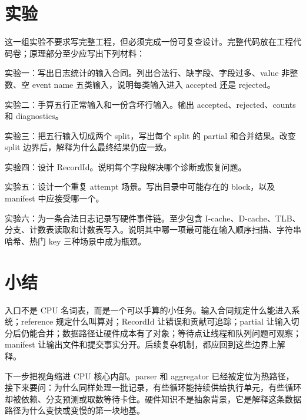 \section{实验}

这一组实验不要求写完整工程，但必须完成一份可复查设计。完整代码放在工程代码卷；原理部分至少应写出下列材料：

\begin{exercisebox}
实验一：写出日志统计的输入合同。列出合法行、缺字段、字段过多、value 非整数、空 event name 五类输入，说明每类输入进入 accepted 还是 rejected。

实验二：手算五行正常输入和一份含坏行输入。输出 accepted、rejected、counts 和 diagnostics。

实验三：把五行输入切成两个 split，写出每个 split 的 partial 和合并结果。改变 split 边界后，解释为什么最终结果仍应一致。

实验四：设计 RecordId。说明每个字段解决哪个诊断或恢复问题。

实验五：设计一个重复 attempt 场景。写出目录中可能存在的 block，以及 manifest 中应接受哪一个。

实验六：为一条合法日志记录写硬件事件链。至少包含 I-cache、D-cache、TLB、分支、计数表读取和计数表写入。说明其中哪一项最可能在输入顺序扫描、字符串哈希、热门 key 三种场景中成为瓶颈。
\end{exercisebox}

\section{小结}

入口不是 CPU 名词表，而是一个可以手算的小任务。输入合同规定什么能进入系统；reference 规定什么叫算对；RecordId 让错误和贡献可追踪；partial 让输入切分后仍能合并；数据路径让硬件成本有了对象；等待点让线程和队列问题可观察；manifest 让输出文件和提交事实分开。后续复杂机制，都应回到这些边界上解释。

下一步把视角缩进 CPU 核心内部。parser 和 aggregator 已经被定位为热路径，接下来要问：为什么同样处理一批记录，有些循环能持续供给执行单元，有些循环却被依赖、分支预测或取数等待卡住。硬件知识不是抽象背景，它是解释这条数据路径为什么变快或变慢的第一块地基。
